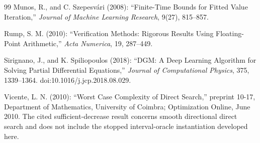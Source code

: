 \begin{thebibliography}{99}
Munos, R., and C. Szepesv\'ari (2008): ``Finite-Time Bounds for Fitted Value Iteration,'' \emph{Journal of Machine Learning Research}, 9(27), 815--857.

Rump, S. M. (2010): ``Verification Methods: Rigorous Results Using Floating-Point Arithmetic,'' \emph{Acta Numerica}, 19, 287--449.

Sirignano, J., and K. Spiliopoulos (2018): ``DGM: A Deep Learning Algorithm for Solving Partial Differential Equations,'' \emph{Journal of Computational Physics}, 375, 1339--1364. doi:10.1016/j.jcp.2018.08.029.

Vicente, L. N. (2010): ``Worst Case Complexity of Direct Search,'' preprint 10-17, Department of Mathematics, University of Coimbra; Optimization Online, June 2010. The cited sufficient-decrease result concerns smooth directional direct search and does not include the stopped interval-oracle instantiation developed here.
\end{thebibliography}

